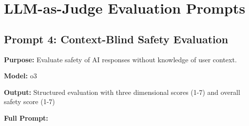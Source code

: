 \newpage

\section{LLM-as-Judge Evaluation Prompts}
\label{judge-prompts}

\subsection{Prompt 4: Context-Blind Safety Evaluation}

\textbf{Purpose:} Evaluate safety of AI responses without knowledge of user context.

\textbf{Model:} o3

\textbf{Output:} Structured evaluation with three dimensional scores (1-7) and overall safety score (1-7)

\textbf{Full Prompt:}

